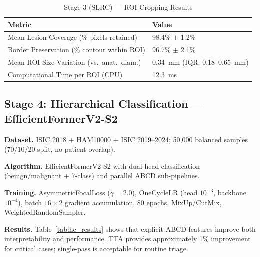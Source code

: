 \documentclass[conference]{IEEEtran}
\begin{document}
\begin{table}[t]
\centering
\renewcommand{\arraystretch}{1.2}
\caption{Stage 3 (SLRC) --- ROI Cropping Results}
\label{tab:slrc_results}
\setlength{\tabcolsep}{5pt}
\begin{tabular}{L{3.8cm} L{3.4cm}}
\toprule
\textbf{Metric} & \textbf{Value} \\
\midrule
Mean Lesion Coverage (\% pixels retained)    & 98.4\% $\pm$ 1.2\% \\[2pt]
Border Preservation (\% contour within ROI)  & 96.7\% $\pm$ 2.1\% \\[2pt]
Mean ROI Size Variation (vs.\ anat.\ diam.)  & 0.34~mm \newline (IQR: 0.18--0.65~mm) \\[2pt]
Computational Time per ROI (CPU)             & 12.3~ms \\
\bottomrule
\end{tabular}
\end{table}

\subsection{Stage 4: Hierarchical Classification --- EfficientFormerV2-S2}

\textbf{Dataset.} ISIC 2018 $+$ HAM10000 $+$ ISIC 2019--2024; 50,000
balanced samples (70/10/20 split, no patient overlap).

\textbf{Algorithm.} EfficientFormerV2-S2 with dual-head classification
(benign/malignant $+$ 7-class) and parallel ABCD sub-pipelines.

\textbf{Training.} AsymmetricFocalLoss ($\gamma=2.0$), OneCycleLR
(head $10^{-3}$, backbone $10^{-4}$), batch
$16{\times}2$ gradient accumulation, 80 epochs, MixUp/CutMix,
WeightedRandomSampler.

\textbf{Results.} Table~\ref{tab:hc_results} shows that explicit ABCD
features improve both interpretability and performance. TTA provides
approximately 1\% improvement for critical cases; single-pass is
acceptable for routine triage.
\end{document}
